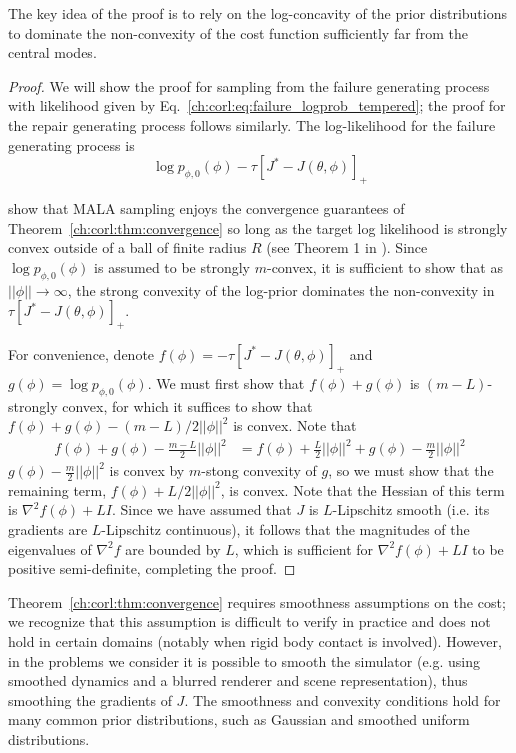 The key idea of the proof is to rely on the log-concavity of the prior distributions to dominate the non-convexity of the cost function sufficiently far from the central modes.

\begin{proof}
    We will show the proof for sampling from the failure generating process with likelihood given by Eq.~\eqref{ch:corl:eq:failure_logprob_tempered}; the proof for the repair generating process follows similarly. The log-likelihood for the failure generating process is
    \begin{equation}
        \log p_{\phi, 0}(\phi) - \tau [J^* - J(\theta, \phi)]_+ \label{ch:corl:eq:failure_logprob}
    \end{equation}

    \cite{maSamplingCanBe2019} show that MALA sampling enjoys the convergence guarantees of Theorem~\ref{ch:corl:thm:convergence} so long as the target log likelihood is strongly convex outside of a ball of finite radius $R$ (see Theorem 1 in \cite{maSamplingCanBe2019}). Since $\log p_{\phi, 0}(\phi)$ is assumed to be strongly $m$-convex, it is sufficient to show that as $||\phi|| \to \infty$, the strong convexity of the log-prior dominates the non-convexity in $\tau [J^* - J(\theta, \phi)]_+$.

    For convenience, denote $f(\phi) = -\tau [J^* - J(\theta, \phi)]_+$ and $g(\phi) = \log p_{\phi, 0}(\phi)$. We must first show that $f(\phi) + g(\phi)$ is $(m-L)$-strongly convex, for which it suffices to show that $f(\phi) + g(\phi) - (m-L)/2 ||\phi||^2$ is convex. Note that
    \begin{align}
        f(\phi) + g(\phi) - \frac{m-L}{2} ||\phi||^2 & = f(\phi) + \frac{L}{2} ||\phi||^2 + g(\phi) - \frac{m}{2} ||\phi||^2
    \end{align}
    $g(\phi) - \frac{m}{2} ||\phi||^2$ is convex by $m$-stong convexity of $g$, so we must show that the remaining term, $f(\phi) + L/2 ||\phi||^2$, is convex. Note that the Hessian of this term is $\nabla^2 f(\phi) + LI$. Since we have assumed that $J$ is $L$-Lipschitz smooth (i.e. its gradients are $L$-Lipschitz continuous), it follows that the magnitudes of the eigenvalues of $\nabla^2 f$ are bounded by $L$, which is sufficient for $\nabla^2 f(\phi) + LI$ to be positive semi-definite, completing the proof.
\end{proof}

Theorem~\ref{ch:corl:thm:convergence} requires smoothness assumptions on the cost; we recognize that this assumption is difficult to verify in practice and does not hold in certain domains (notably when rigid body contact is involved). However, in the problems we consider it is possible to smooth the simulator (e.g. using smoothed dynamics and a blurred renderer and scene representation), thus smoothing the gradients of $J$. The smoothness and convexity conditions hold for many common prior distributions, such as Gaussian and smoothed uniform distributions.

